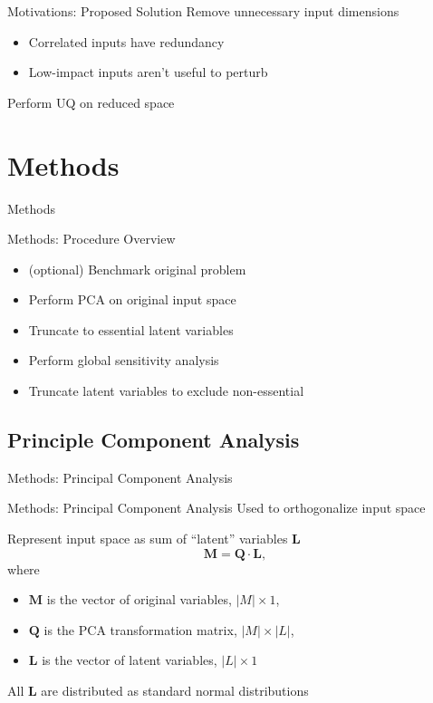\documentclass[t,9pt,svgnames]{beamer}
\begin{document}
\begin{frame}{Motivations: Proposed Solution}
  \vfill
  Remove unnecessary input dimensions
  \vfill
  \begin{itemize}
    \item Correlated inputs have redundancy
  \vfill
    \item Low-impact inputs aren't useful to perturb
  \end{itemize}
  \vfill
  Perform UQ on reduced space
  \vfill
\end{frame}
\section{Methods}
\begin{frame}{Methods}
\end{frame}

\begin{frame}{Methods: Procedure Overview}
  \vfill
  \begin{itemize}
    \item (optional) Benchmark original problem
  \vfill
    \item Perform PCA on original input space
  \vfill
    \item Truncate to essential latent variables
  \vfill
    \item Perform global sensitivity analysis
  \vfill
    \item Truncate latent variables to exclude non-essential
  \end{itemize}
\end{frame}
  \vfill

\subsection{Principle Component Analysis}
\begin{frame}{Methods: Principal Component Analysis}
\end{frame}

\begin{frame}{Methods: Principal Component Analysis}
  \vfill
  Used to orthogonalize input space
  \vfill

  Represent input space as sum of ``latent'' variables $\bm{L}$
  \begin{equation}
    \bm{M} = \bm{Q} \cdot \bm{L},
  \end{equation}
  where
  \vfill
  \begin{itemize}
    \item $\bm{M}$ is the vector of original variables, $|M|\times1$,
  \vfill
    \item $\bm{Q}$ is the PCA transformation matrix, $|M|\times |L|$,
  \vfill
    \item $\bm{L}$ is the vector of latent variables, $|L|\times 1$
  \end{itemize}
  \vfill
  All $\bm{L}$ are distributed as standard normal distributions
  \vfill
\end{frame}
\end{document}
